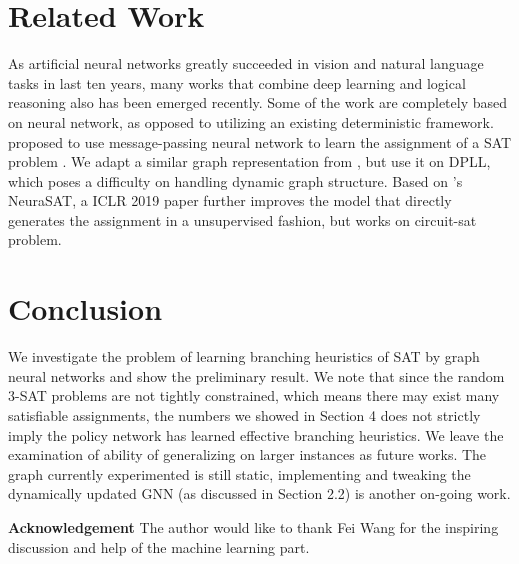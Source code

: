 \documentclass[sigplan,10pt]{acmart}\settopmatter{printfolios=true,printccs=false,printacmref=false}
\begin{document}
\section{Related Work}

As artificial neural networks greatly succeeded in vision and natural language tasks in last ten years,
many works that combine deep learning and logical reasoning also has been emerged recently.
Some of the work are completely based on neural network, as opposed to utilizing
an existing deterministic framework. \citeauthor{selsam2018learning} proposed to 
use message-passing neural network to learn the assignment of a SAT problem \cite{selsam2018learning}.
We adapt a similar graph representation from \citeauthor{selsam2018learning}, but use it 
on DPLL, which poses a difficulty on handling dynamic graph structure.
Based on \citeauthor{selsam2018learning}'s NeuraSAT, a ICLR 2019 paper
further improves the model that directly generates the assignment in a unsupervised fashion, 
but works on circuit-sat problem\cite{anonymous2019learning}.

\section{Conclusion}

We investigate the problem of learning branching heuristics of SAT by 
graph neural networks and show the preliminary result. 
We note that since the random 3-SAT problems are not tightly constrained,
which means there may exist many satisfiable assignments, the numbers we showed
in Section 4 does not strictly imply the policy network has learned effective
branching heuristics. We leave the examination of ability of generalizing
on larger instances as future works. The graph currently experimented is still 
static, implementing and tweaking the dynamically updated GNN (as discussed in 
Section 2.2) is another on-going work.

\textbf{Acknowledgement} The author would like to thank Fei Wang for the inspiring discussion and 
help of the machine learning part.

\clearpage{}







\end{document}
